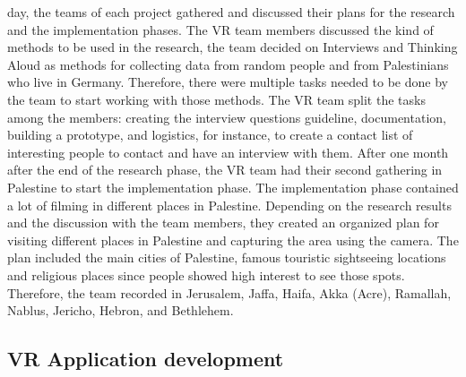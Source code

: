 day, the teams of each project gathered and discussed their plans for the research and the
implementation phases. The VR team members discussed the kind of methods to be used in
the research, the team decided on Interviews and Thinking Aloud as methods for collecting
data from random people and from Palestinians who live in Germany. Therefore, there were
multiple tasks needed to be done by the team to start working with those methods. The VR
team split the tasks among the members: creating the interview questions guideline,
documentation, building a prototype, and logistics, for instance, to create a contact list of
interesting people to contact and have an interview with them.
After one month after the end of the research phase, the VR team had their second gathering
in Palestine to start the implementation phase. The implementation phase contained a lot of
filming in different places in Palestine. Depending on the research results and the discussion
with the team members, they created an organized plan for visiting different places in
Palestine and capturing the area using the camera. The plan included the main cities of
Palestine, famous touristic sightseeing locations and religious places since people showed
high interest to see those spots. Therefore, the team recorded in Jerusalem, Jaffa, Haifa, Akka
(Acre), Ramallah, Nablus, Jericho, Hebron, and Bethlehem.
\subsection{VR Application development}